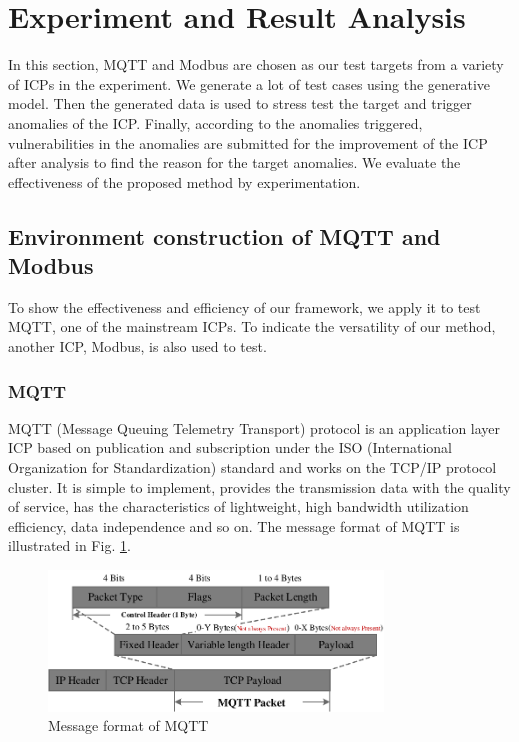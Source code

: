 \section{Experiment and Result Analysis}
In this section, MQTT and Modbus are chosen as our test targets from a variety of ICPs in the experiment. We generate a lot of test cases using the generative model. Then the generated data is used to stress test the target and trigger anomalies of the ICP. Finally,  according to the anomalies triggered, vulnerabilities in the anomalies are submitted for the improvement of the ICP after analysis to find the reason for the target anomalies. We evaluate the effectiveness of the proposed method by experimentation. 

\subsection{Environment construction of MQTT and Modbus}
To show the effectiveness and efficiency of our framework, we apply it to test MQTT, one of the mainstream ICPs. To indicate the versatility of our method, another ICP, Modbus, is also used to test.

\subsubsection{MQTT}
MQTT (Message Queuing Telemetry Transport) protocol is an application layer ICP based on publication and subscription under the ISO (International Organization for Standardization) standard and works on the TCP/IP protocol cluster. It is simple to implement, provides the transmission data with the quality of service, has the characteristics of lightweight, high bandwidth utilization efficiency, data independence and so on. The message format of MQTT is illustrated in Fig. \ref{FigMQTTFormat}.  

\begin{figure}[htbp]   %
	\centering 
	\includegraphics[width=3.5in]{FigMQTTFormat.pdf}
	\caption{Message format of MQTT}
	\label{FigMQTTFormat}
\end{figure}

